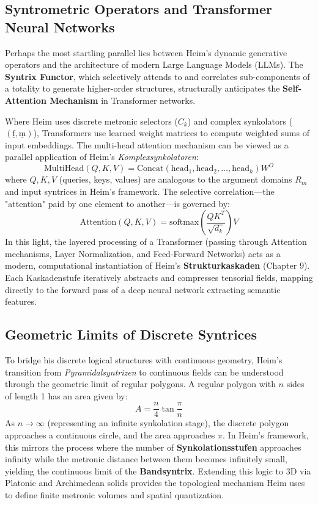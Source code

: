 \documentclass[12pt]{article}
\begin{document}
\subsection{Syntrometric Operators and Transformer Neural Networks}
Perhaps the most startling parallel lies between Heim's dynamic generative operators and the architecture of modern Large Language Models (LLMs). The \textbf{Syntrix Functor}, which selectively attends to and correlates sub-components of a totality to generate higher-order structures, structurally anticipates the \textbf{Self-Attention Mechanism} in Transformer networks. 

Where Heim uses discrete metronic selectors ($C_k$) and complex synkolators ($(\underline{\mathrm{f}}, \underline{\mathrm{m}})$), Transformers use learned weight matrices to compute weighted sums of input embeddings. The multi-head attention mechanism can be viewed as a parallel application of Heim's \textit{Komplexsynkolatoren}:
\begin{equation*}
\text{MultiHead}(Q, K, V) = \text{Concat}(\text{head}_1, \text{head}_2, \dots, \text{head}_h)W^O
\end{equation*}
where $Q, K, V$ (queries, keys, values) are analogous to the argument domains $R_m$ and input syntrices in Heim's framework. The selective correlation—the "attention" paid by one element to another—is governed by:
\begin{equation*}
\text{Attention}(Q, K, V) = \text{softmax}\left(\frac{QK^T}{\sqrt{d_k}}\right)V
\end{equation*}
In this light, the layered processing of a Transformer (passing through Attention mechanisms, Layer Normalization, and Feed-Forward Networks) acts as a modern, computational instantiation of Heim's \textbf{Strukturkaskaden} (Chapter 9). Each Kaskadenstufe iteratively abstracts and compresses tensorial fields, mapping directly to the forward pass of a deep neural network extracting semantic features.

\subsection{Geometric Limits of Discrete Syntrices}
To bridge his discrete logical structures with continuous geometry, Heim's transition from \textit{Pyramidalsyntrizen} to continuous fields can be understood through the geometric limit of regular polygons. A regular polygon with $n$ sides of length 1 has an area given by:
\begin{equation*}
A = \frac{n}{4} \tan \frac{\pi}{n}
\end{equation*}
As $n \to \infty$ (representing an infinite synkolation stage), the discrete polygon approaches a continuous circle, and the area approaches $\pi$. In Heim's framework, this mirrors the process where the number of \textbf{Synkolationsstufen} approaches infinity while the metronic distance between them becomes infinitely small, yielding the continuous limit of the \textbf{Bandsyntrix}. Extending this logic to 3D via Platonic and Archimedean solids provides the topological mechanism Heim uses to define finite metronic volumes and spatial quantization.
\end{document}
